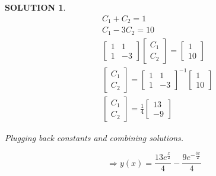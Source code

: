 \documentclass{article}
\theoremstyle{solution}
\newtheorem*{solution}{SOLUTION}
\theoremstyle{definition}
\begin{document}
\begin{solution}
    \begin{align*}
        & C_1 + C_2 = 1 \\
        & C_1 - 3C_2 = 10\\
        & \begin{bmatrix}
            1 & 1 \\
            1 & -3
        \end{bmatrix}
        \begin{bmatrix}
            C_1 \\
            C_2
        \end{bmatrix}
        =
        \begin{bmatrix}
            1 \\
            10
        \end{bmatrix} \\
        & \begin{bmatrix}
            C_1 \\
            C_2
        \end{bmatrix}
        =
        \begin{bmatrix}
            1 & 1 \\
            1 & -3
        \end{bmatrix}^{-1}
        \begin{bmatrix}
            1 \\
            10
        \end{bmatrix} \\
        &
        \boxed{
        \begin{bmatrix}
            C_1 \\
            C_2
        \end{bmatrix}
        =
        \frac{1}{4}
        \begin{bmatrix}
            13 \\
            -9
        \end{bmatrix}
        }
    \end{align*}

    Plugging back constants and combining solutions.

    \begin{equation*}
        \Longrightarrow \boxed{y(x) = \frac{13e^{\frac{x}{2}}}{4}  - \frac{9e^{-\frac{3x}{2}}}{4} }
    \end{equation*}
\end{solution}



\end{document}
